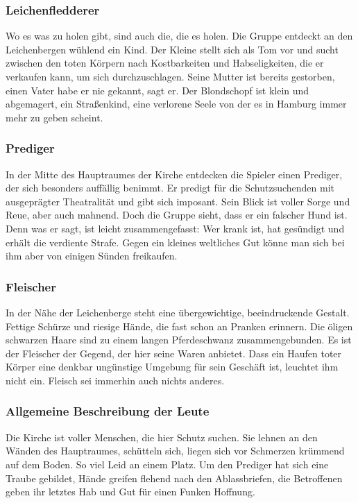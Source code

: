 \subsubsection*{Leichenfledderer}
\label{Leichenfledderer}

Wo es was zu holen gibt, sind auch die, die es holen. Die Gruppe entdeckt an den Leichenbergen wühlend ein Kind. Der Kleine stellt sich als Tom vor und sucht zwischen den toten Körpern nach Kostbarkeiten und Habseligkeiten, die er verkaufen kann, um sich durchzuschlagen. Seine Mutter ist bereits gestorben, einen Vater habe er nie gekannt, sagt er. Der Blondschopf ist klein und abgemagert, ein Straßenkind, eine verlorene Seele von der es in Hamburg immer mehr zu geben scheint.

\subsubsection*{Prediger}
\label{Prediger}

In der Mitte des Hauptraumes der Kirche entdecken die Spieler einen Prediger, der sich besonders auffällig benimmt. Er predigt für die Schutzsuchenden mit ausgeprägter Theatralität und gibt sich imposant. Sein Blick ist voller Sorge und Reue, aber auch mahnend. Doch die Gruppe sieht, dass er ein falscher Hund ist. Denn was er sagt, ist leicht zusammengefasst: Wer krank ist, hat gesündigt und erhält die verdiente Strafe. Gegen ein kleines weltliches Gut könne man sich bei ihm aber von einigen Sünden freikaufen.

\subsubsection*{Fleischer}
\label{Fleischer}

In der Nähe der Leichenberge steht eine übergewichtige, beeindruckende Gestalt. Fettige Schürze und riesige Hände, die fast schon an Pranken erinnern. Die öligen schwarzen Haare sind zu einem langen Pferdeschwanz zusammengebunden. Es ist der Fleischer der Gegend, der hier seine Waren anbietet. Dass ein Haufen toter Körper eine denkbar ungünstige Umgebung für sein Geschäft ist, leuchtet ihm nicht ein. Fleisch sei immerhin auch nichts anderes.

\subsubsection*{Allgemeine Beschreibung der Leute}
\label{Leute}

Die Kirche ist voller Menschen, die hier Schutz suchen. Sie lehnen an den Wänden des Hauptraumes, schütteln sich, liegen sich vor Schmerzen krümmend auf dem Boden. So viel Leid an einem Platz. Um den Prediger hat sich eine Traube gebildet, Hände greifen flehend nach den Ablassbriefen, die Betroffenen geben ihr letztes Hab und Gut für einen Funken Hoffnung.


